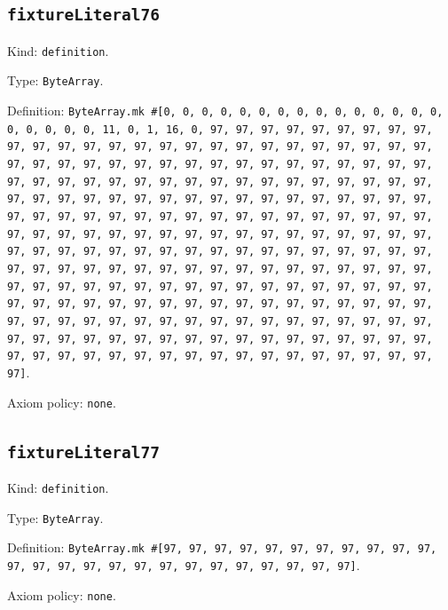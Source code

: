 \documentclass[11pt]{article}
\begin{document}
\subsection*{\texttt{fixtureLiteral76}}
\noindent Kind: \texttt{definition}.\par
\noindent Type: \texttt{ByteArray}.\par
\noindent Definition: \texttt{ByteArray.mk \#[0, 0, 0, 0, 0, 0, 0, 0, 0, 0, 0, 0, 0, 0, 0, 0, 0, 0, 0, 0, 11, 0, 1, 16, 0, 97, 97, 97, 97, 97, 97, 97, 97, 97, 97, 97, 97, 97, 97, 97, 97, 97, 97, 97, 97, 97, 97, 97, 97, 97, 97, 97, 97, 97, 97, 97, 97, 97, 97, 97, 97, 97, 97, 97, 97, 97, 97, 97, 97, 97, 97, 97, 97, 97, 97, 97, 97, 97, 97, 97, 97, 97, 97, 97, 97, 97, 97, 97, 97, 97, 97, 97, 97, 97, 97, 97, 97, 97, 97, 97, 97, 97, 97, 97, 97, 97, 97, 97, 97, 97, 97, 97, 97, 97, 97, 97, 97, 97, 97, 97, 97, 97, 97, 97, 97, 97, 97, 97, 97, 97, 97, 97, 97, 97, 97, 97, 97, 97, 97, 97, 97, 97, 97, 97, 97, 97, 97, 97, 97, 97, 97, 97, 97, 97, 97, 97, 97, 97, 97, 97, 97, 97, 97, 97, 97, 97, 97, 97, 97, 97, 97, 97, 97, 97, 97, 97, 97, 97, 97, 97, 97, 97, 97, 97, 97, 97, 97, 97, 97, 97, 97, 97, 97, 97, 97, 97, 97, 97, 97, 97, 97, 97, 97, 97, 97, 97, 97, 97, 97, 97, 97, 97, 97, 97, 97, 97, 97, 97, 97, 97, 97, 97, 97, 97, 97, 97, 97, 97, 97, 97, 97, 97, 97, 97, 97, 97, 97, 97, 97, 97, 97, 97, 97, 97, 97, 97, 97, 97, 97, 97, 97, 97, 97, 97, 97, 97]}.\par
\noindent Axiom policy: \texttt{none}.\par
\subsection*{\texttt{fixtureLiteral77}}
\noindent Kind: \texttt{definition}.\par
\noindent Type: \texttt{ByteArray}.\par
\noindent Definition: \texttt{ByteArray.mk \#[97, 97, 97, 97, 97, 97, 97, 97, 97, 97, 97, 97, 97, 97, 97, 97, 97, 97, 97, 97, 97, 97, 97, 97, 97]}.\par
\noindent Axiom policy: \texttt{none}.\par
\end{document}
